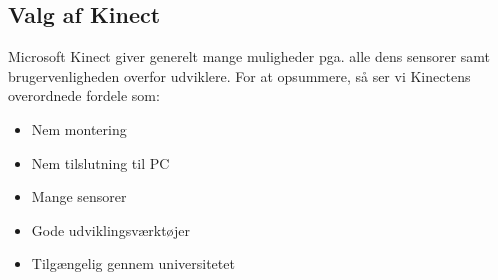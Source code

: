 %
%

\subsection{Valg af Kinect}\label{kinect:argumentation}
Microsoft Kinect giver generelt mange muligheder pga. alle dens sensorer samt brugervenligheden overfor udviklere.
For at opsummere, så ser vi Kinectens overordnede fordele som:

\begin{itemize}
\item Nem montering
\item Nem tilslutning til PC
\item Mange sensorer
\item Gode udviklingsværktøjer
\item Tilgængelig gennem universitetet
\end{itemize}


